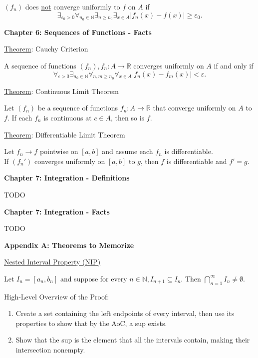 \documentclass[12pt]{article}
\newcommand{\RR}{\mathbb{R}} %
\newcommand{\NN}{\mathbb{N}}
\newcommand\abs[1]{\left| #1 \right|} %
\newcommand{\eps}{\varepsilon}
\begin{document}
$(f_n)$ does \underline{not} converge uniformly to $f$ on $A$ if
\[
\exists_{\eps_0 > 0} \forall_{n_0 \in \NN} \exists_{n \ge n_0} \exists_{x \in A} \abs{f_n (x) - f(x)} \ge \eps_0.
\]

\pagebreak

\textbf{Chapter 6: Sequences of Functions - Facts}

\hrulefill

\underline{Theorem}: Cauchy Criterion

A sequence of functions $(f_n), f_n : A \rightarrow \RR$ converges uniformly on $A$ if and only if
\[
\forall_{\eps > 0} \exists_{n_0 \in \NN} \forall_{n, m \ge n_0} \forall_{x \in A} \abs{f_n (x) - f_m (x)} < \eps.
\]

\hrulefill

\underline{Theorem}: Continuous Limit Theorem

Let $(f_n)$ be a sequence of functions $f_n : A \rightarrow \RR$ that converge uniformly on $A$ to $f$. If each $f_n$ is continuous at $c \in A$, then so is $f$.

\hrulefill

\underline{Theorem}: Differentiable Limit Theorem

Let $f_n \rightarrow f$ pointwise on $[a, b]$ and assume each $f_n$ is differentiable.
\\
If $(f_n ')$ converges uniformly on $[a, b]$ to $g$, then $f$ is differentiable and $f' = g$.

\pagebreak

\textbf{Chapter 7: Integration - Definitions}

\hrulefill

TODO

\pagebreak

\textbf{Chapter 7: Integration - Facts}

\hrulefill

TODO

\pagebreak

\textbf{Appendix A: Theorems to Memorize}

\hrulefill

\underline{Nested Interval Property (NIP)}

Let $I_n = [a_n, b_n]$ and suppose for every $n \in \NN, I_{n + 1} \subseteq {I_n}$. Then $\bigcap_{n = 1}^{\infty} I_n \ne \emptyset$.

\dotfill

High-Level Overview of the Proof:
\begin{enumerate}
\item Create a set containing the left endpoints of every interval, then use its properties to show that by the AoC, a sup exists.

\item Show that the sup is the element that all the intervals contain, making their intersection nonempty.
\end{enumerate}
\end{document}
